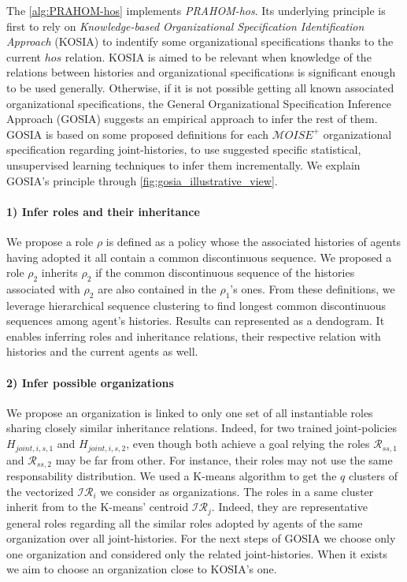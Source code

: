 \documentclass{ecai}
\newcounter{relation}
\begin{document}
The \autoref{alg:PRAHOM-hos} implements \emph{PRAHOM-hos}. Its underlying principle is first to rely on \emph{Knowledge-based Organizational Specification Identification Approach} (KOSIA) to indentify some organizational specifications thanks to the current $hos$ relation. KOSIA is aimed to be relevant when knowledge of the relations between histories and organizational specifications is significant enough to be used generally.
Otherwise, if it is not possible getting all known associated organizational specifications, the General Organizational Specification Inference Approach (GOSIA) suggests an empirical approach to infer the rest of them.
GOSIA is based on some proposed definitions for each $\mathcal{M}OISE^+$ organizational specification regarding joint-histories, to use suggested specific statistical, unsupervised learning techniques to infer them incrementally. We explain GOSIA's principle through \autoref{fig:gosia_illustrative_view}.
%
\paragraph{1) Infer roles and their inheritance}

We propose a role $\rho$ is defined as a policy whose the associated histories of agents having adopted it all contain a common discontinuous sequence. We proposed a role $\rho_2$ inherits $\rho_2$ if the common discontinuous sequence of the histories associated with $\rho_2$ are also contained in the $\rho_1$'s ones.
From these definitions, we leverage hierarchical sequence clustering to find longest common discontinuous sequences among agent's histories. Results can represented as a dendogram. It enables inferring roles and inheritance relations, their respective relation with histories and the current agents as well.

\paragraph{2) Infer possible organizations}

We propose an organization is linked to only one set of all instantiable roles sharing closely similar inheritance relations. Indeed, for two trained joint-policies $H_{joint,i,s,1}$ and $H_{joint,i,s,2}$, even though both achieve a goal relying the roles $\mathcal{R}_{ss,1}$ and $\mathcal{R}_{ss,2}$ may be far from other. For instance, their roles may not use the same responsability distribution.
We used a K-means algorithm to get the $q$ clusters of the vectorized $\mathcal{IR}_{i}$ we consider as organizations. The roles in a same cluster inherit from to the K-means' centroid $\mathcal{IR}_j$. Indeed, they are representative general roles regarding all the similar roles adopted by agents of the same organization over all joint-histories.
For the next steps of GOSIA we choose only one organization and considered only the related joint-histories. When it exists we aim to choose an organization close to KOSIA's one.
\end{document}
